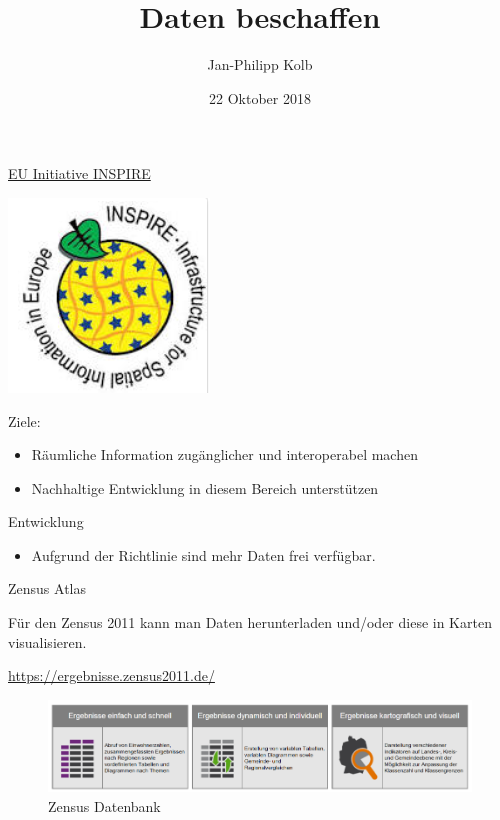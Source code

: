 \documentclass[ignorenonframetext,]{beamer}
\title{Daten beschaffen}
\author{Jan-Philipp Kolb}
\date{22 Oktober 2018}
\providecommand{\tightlist}{%
  \setlength{\itemsep}{0pt}\setlength{\parskip}{0pt}}
\begin{document}
\frame{\titlepage}

\begin{frame}

\end{frame}

\begin{frame}{\href{http://inspire.ec.europa.eu/reports/Registration_form.pdf}{EU
Initiative INSPIRE}}
\protect\hypertarget{eu-initiative-inspire}{}

\includegraphics{figure/inspire.PNG}

\begin{block}{Ziele:}

\begin{itemize}
\tightlist
\item
  Räumliche Information zugänglicher und interoperabel machen
\item
  Nachhaltige Entwicklung in diesem Bereich unterstützen
\end{itemize}

\end{block}

\begin{block}{Entwicklung}

\begin{itemize}
\tightlist
\item
  Aufgrund der Richtlinie sind mehr Daten frei verfügbar.
\end{itemize}

\end{block}

\end{frame}

\begin{frame}{Zensus Atlas}
\protect\hypertarget{zensus-atlas}{}

Für den Zensus 2011 kann man Daten herunterladen und/oder diese in
Karten visualisieren.

\begin{block}{\url{https://ergebnisse.zensus2011.de/}}

\begin{figure}
\centering
\includegraphics{figure/Zensusdtb.PNG}
\caption{Zensus Datenbank}
\end{figure}

\end{block}

\end{frame}
\end{document}
